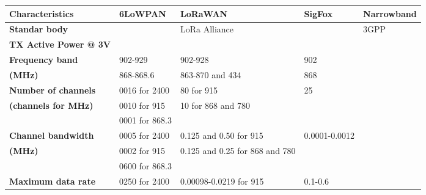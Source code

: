 \begin{table}[h!]
\scriptsize
	\begin{tabulary}{\textwidth}{L|L|L|L|L}
	\bf{Characteristics}                           & \bf{6LoWPAN}              & \bf{LoRaWAN}                    & \bf{SigFox}                           & \bf{Narrowband}\\\hline
	\bf{Standar body}                              &                           & LoRa Alliance                   &                                       & 3GPP          \\\hline
	\bf{TX Active Power @ 3V}                      &                           &                                 &                                       &               \\\hline
	\bf{Frequency band}                            & 902-929                   & 902-928                         & 902                                   &               \\
	\bf{\footnotesize{(MHz)}}                      & 868-868.6                 & 863-870 and 434                 & 868                                   &               \\\hline
	\bf{Number of channels}                        & 0016 for 2400             & 80             for 915          & 25                                    &               \\
	\bf{\footnotesize{(channels for MHz)}}         & 0010 for 915              & 10             for 868 and 780  &                                       &               \\
	\                                              & 0001 for 868.3            &                                 &                                       &               \\\hline
	\bf{Channel bandwidth}                         & 0005 for 2400             & 0.125 and 0.50 for 915          & 0.0001-0.0012                         &               \\
	\bf{\footnotesize{(MHz)}}                      & 0002 for 915              & 0.125 and 0.25 for 868 and 780  &                                       &               \\
	\                                              & 0600 for 868.3            &                                 &                                       &               \\\hline
	\bf{Maximum data rate}                         & 0250 for 2400             & 0.00098-0.0219 for 915          & 0.1-0.6                               &               \\

\end{tabulary}
\end{table}

